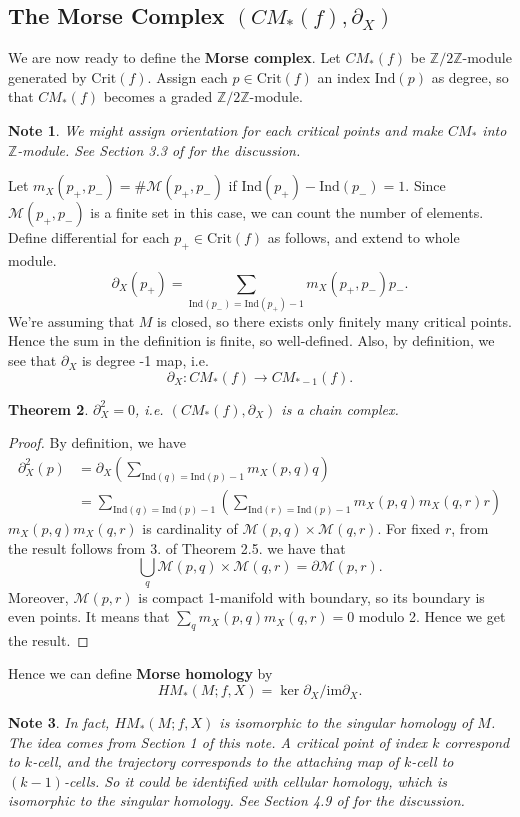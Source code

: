 \documentclass{article}
\newtheorem{theorem}{Theorem}[section]
\newtheorem{note}[theorem]{Note}
\newcommand{\Z}{\mathbb{Z}}
\newcommand{\pp}{\partial}
\newcommand{\M}{\mathcal{M}}
\newcommand{\Crit}{\mathrm{Crit}}
\newcommand{\Ind}{\mathrm{Ind}}
\begin{document}
\subsection{The Morse Complex $(CM_*(f),\pp_X)$}
We are now ready to define the \textbf{Morse complex}.
Let $CM_*(f)$ be $\Z/2\Z$-module generated by $\Crit(f)$.
Assign each $p\in\Crit(f)$ an index $\Ind(p)$ as degree, so that $CM_*(f)$ becomes a graded $\Z/2\Z$-module.

	\begin{note}\rm
	We might assign orientation for each critical points and make $CM_*$ into $\Z$-module.
	See Section 3.3 of \cite{ad} for the discussion.
	\end{note}

Let $m_X(p_+,p_-)=\#\M(p_+,p_-)$ if $\Ind(p_+)-\Ind(p_-)=1$.
Since $\M(p_+,p_-)$ is a finite set in this case, we can count the number of elements.
Define differential for each $p_+\in\Crit(f)$ as follows, and extend to whole module.
	$$\pp_X(p_+)=\sum_{\Ind(p_-)=\Ind(p_+)-1}m_X(p_+,p_-)p_-.$$
We're assuming that $M$ is closed, so there exists only finitely many critical points.
Hence the sum in the definition is finite, so well-defined.
Also, by definition, we see that $\pp_X$ is degree -1 map, i.e.
	$$\pp_X:CM_*(f)\to CM_{*-1}(f).$$

	\begin{theorem}\rm
	$\pp_X^2=0$, i.e. $(CM_*(f),\pp_X)$ is a chain complex.
	\end{theorem}
		\begin{proof}
		By definition, we have
			$$\begin{aligned}
			\pp_X^2(p)&=\pp_X\left(\sum_{\Ind(q)=\Ind(p)-1}m_X(p,q)q\right)\\
				&=\sum_{\Ind(q)=\Ind(p)-1}\left(\sum_{\Ind(r)=\Ind(p)-1}m_X(p,q)m_X(q,r)r\right)
				\end{aligned}$$
		$m_X(p,q)m_X(q,r)$ is cardinality of $\M(p,q)\times\M(q,r)$.
		For fixed $r$, from the result follows from 3. of Theorem 2.5.
		we have that
			$$\bigcup_q\M(p,q)\times\M(q,r)=\pp\M(p,r).$$
		Moreover, $\M(p,r)$ is compact 1-manifold with boundary, so its boundary is even points.
		It means that $\sum_qm_X(p,q)m_X(q,r)=0$ modulo 2.
		Hence we get the result.
		\end{proof}

Hence we can define \textbf{Morse homology} by
	$$HM_*(M;f,X)=\ker\pp_X/\mathrm{im}\pp_X.$$

	\begin{note}\rm
	In fact, $HM_*(M;f,X)$ is isomorphic to the singular homology of $M$.
	The idea comes from Section 1 of this note.
	A critical point of index $k$ correspond to $k$-cell, and the trajectory corresponds to the attaching map of $k$-cell to $(k-1)$-cells.
	So it could be identified with cellular homology, which is isomorphic to the singular homology.
	See Section 4.9 of \cite{ad} for the discussion.
	\end{note}
	
\end{document}
